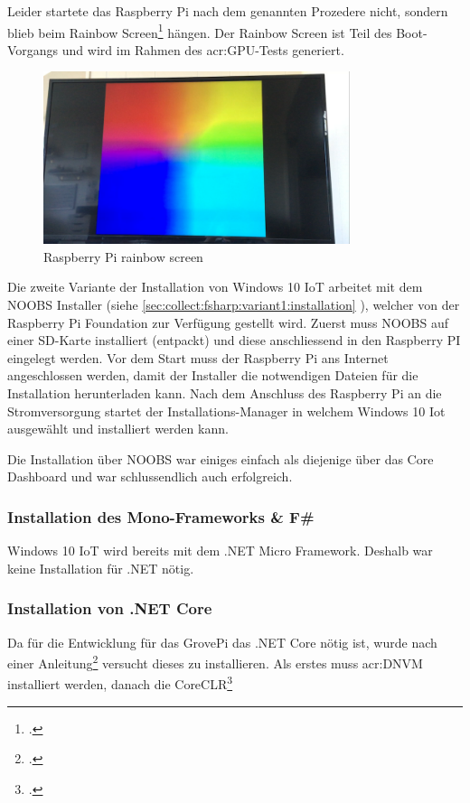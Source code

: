 Leider startete das Raspberry Pi nach dem genannten Prozedere nicht, sondern blieb beim Rainbow Screen\footcite{RPi_Rainbowscreen_2016-04-25} hängen. Der Rainbow Screen ist Teil des Boot-Vorgangs und wird im Rahmen des \gls{acr:GPU}-Tests generiert.

\begin{figure}[H]
  \centering
  \includegraphics[width=0.8\textwidth]{./images/raspberry-rainbow-screen.png}
  \caption{Raspberry Pi rainbow screen}
\end{figure}

Die zweite Variante der Installation von Windows 10 IoT arbeitet mit dem NOOBS Installer (siehe \ref{sec:collect:fsharp:variant1:installation} ), welcher von der Raspberry Pi Foundation zur Verfügung gestellt wird. Zuerst muss NOOBS auf einer SD-Karte installiert (entpackt) und diese anschliessend in den Raspberry PI eingelegt werden. Vor dem Start muss der Raspberry Pi ans Internet angeschlossen werden, damit der Installer die notwendigen Dateien für die Installation herunterladen kann. Nach dem Anschluss des Raspberry Pi an die Stromversorgung startet der Installations-Manager in welchem Windows 10 Iot ausgewählt und installiert werden kann.

Die Installation über NOOBS war einiges einfach als diejenige über das Core Dashboard und war schlussendlich auch erfolgreich.

\subsubsection{Installation des Mono-Frameworks \& F\#}
Windows 10 IoT wird bereits mit dem .NET Micro Framework. Deshalb war keine Installation für .NET nötig.

\subsubsection{Installation von .NET Core}
Da für die Entwicklung für das GrovePi das .NET Core nötig ist, wurde nach einer Anleitung\footcite{How_to_run_DotNET_Core_Application_on_Pi2} versucht dieses zu installieren. Als erstes muss \gls{acr:DNVM} installiert werden, danach die CoreCLR\footcite{CoreCLR_2016-06-17}

